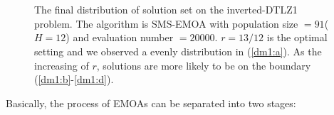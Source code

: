 \documentclass[conference]{IEEEtran}
\begin{document}
\begin{figure}[!t]
  \centering
  \quad
  \\
  \quad
  \\
  \caption{The final distribution of solution set on the inverted-DTLZ1 problem.
  The algorithm is SMS-EMOA with population size $=91$($H=12$) and evaluation number $=20000$.
  $r=13/12$ is the optimal setting and we observed a evenly distribution in (\ref{dm1:a}).
  As the increasing of $r$, solutions are more likely to be on the boundary
  (\ref{dm1:b}-\ref{dm1:d}). 
  }
  \label{dm1}
\end{figure}

%
% 
Basically, the process of EMOAs can be separated into
two stages:
\end{document}
